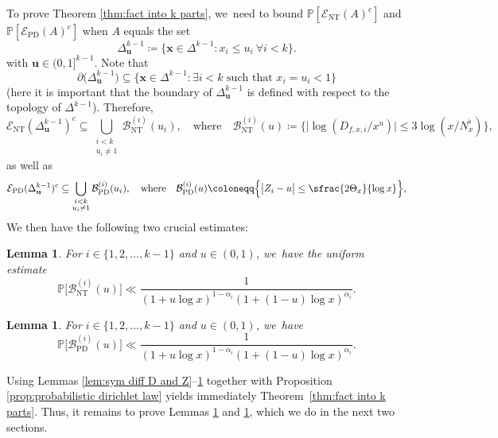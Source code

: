 \documentclass[10pt]{amsart}
\newcommand{\bu}{{\boldsymbol u}}
\newcommand{\bx}{{\boldsymbol x}}
\newcommand{\PP}{\mathbb{P}}
\newcommand{\EC}{\mathcal{E}}
\newcommand{\simplex}{\Delta^{k-1}}
\newcommand{\bg}{\big}
\newcommand{\bgg}{\Big}
\newcommand{\ECnt}{\EC_{\mathrm{NT}}}
\newcommand{\ECprob}{\EC_{\mathrm{PD}}}
\newcommand{\Bnt}{\mathcal{B}_{\mathrm{NT}}}
\newcommand{\Bprob}{\mathcal{B}_{\mathrm{PD}}}
\theoremstyle{plain}
\newtheorem{lem}[cor]{Lemma}
\theoremstyle{definition}
\begin{document}
To prove Theorem \ref{thm:fact into k parts}, we~need to bound $\PP[\ECnt(A)^c]$ and $\PP[\ECprob(A)^c]$ when $A$ equals the set
\[
\simplex_{\mathbf{u}} \coloneqq \{\bx\in \simplex: x_i\le u_i\ \forall i<k\}.
\]
with $\bu\in(0,1]^{k-1}$. Note that
\[
\partial \bg(\simplex_{\mathbf{u}}\bg) \subseteq \{\bx \in \simplex : \exists i < k \text{ such that } x_i = u_i < 1\}
\]
(here it is important that the boundary of $\simplex_{\mathbf{u}}$ is defined with respect to the topology of $\simplex$). Therefore,
\[
\ECnt(\simplex_{\mathbf{u}})^c\subseteq\! \bigcup_{\substack{i<k \\ u_i\neq 1}} \Bnt^{(i)}(u_i),
\quad\text{where}\quad
\Bnt^{(i)}(u) \coloneqq \bgg\{ \bg| \log(D_{f,x,i}/x^u)\bg|\le 3\log(x/N_x^\flat) \bgg\},
\]
as well as
\[
\ECprob(\simplex_{\mathbf{u}})^c\subseteq \bigcup_{\substack{i< k \\ u_i\neq 1}} \Bprob^{(i)}(u_i),
\quad\text{where}\quad
\Bprob^{(i)}(u) \coloneqq \bgg\{ \bg| Z_i - u \bg|\le \sfrac{2\Theta_x}{\log x} \bgg\},
\]
We then have the following two crucial estimates:

\begin{lem}
\label{lem:bound of prob of ECnt}
For $i\in\{1,2,\dots,k-1\}$ and $u\in(0,1)$, we~have the uniform estimate
\[
\PP\bg[\Bnt^{(i)}(u) \bg] \ll \frac{1}{(1+ u\log x)^{1-\alpha_i}(1+(1-u)\log x)^{\alpha_i}}.
\]
\end{lem}

\begin{lem}
\label{lem:bound of prob of ECprob}
For $i\in\{1,2,\dots,k-1\}$ and $u\in(0,1)$, we~have
\[
\PP\bg[\Bprob^{(i)}(u) \bg] \ll \frac{1}{(1+ u\log x)^{1-\alpha_i}(1+(1-u)\log x)^{\alpha_i}}.
\]
\end{lem}

Using Lemmas \ref{lem:sym diff D and Z}--\ref{lem:bound of prob of ECprob} together with Proposition \ref{prop:probabilistic dirichlet law} yields immediately Theorem~\ref{thm:fact into k parts}. Thus, it remains to prove Lemmas \ref{lem:bound of prob of ECnt} and \ref{lem:bound of prob of ECprob}, which we do in the next two sections.
\end{document}
